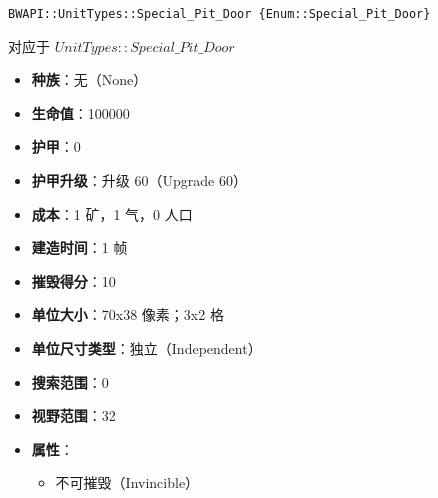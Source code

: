 \begin{tcolorbox}[colback=white, colframe=black!60!white, title=Special\_Pit\_Door(), arc=0mm]
    \begin{verbatim}
BWAPI::UnitTypes::Special_Pit_Door {Enum::Special_Pit_Door}
    \end{verbatim}
    对应于  $UnitTypes::Special\_Pit\_Door$ 
    \begin{itemize}
        \item \textbf{种族}：无（None）
        \item \textbf{生命值}：100000
        \item \textbf{护甲}：0
        \item \textbf{护甲升级}：升级 60（Upgrade 60）
        \item \textbf{成本}：1 矿，1 气，0 人口
        \item \textbf{建造时间}：1 帧
        \item \textbf{摧毁得分}：10
        \item \textbf{单位大小}：70x38 像素；3x2 格
        \item \textbf{单位尺寸类型}：独立（Independent）
        \item \textbf{搜索范围}：0
        \item \textbf{视野范围}：32
        \item \textbf{属性}：
            \begin{itemize}
                \item 不可摧毁（Invincible）
            \end{itemize}
    \end{itemize}
\end{tcolorbox}

